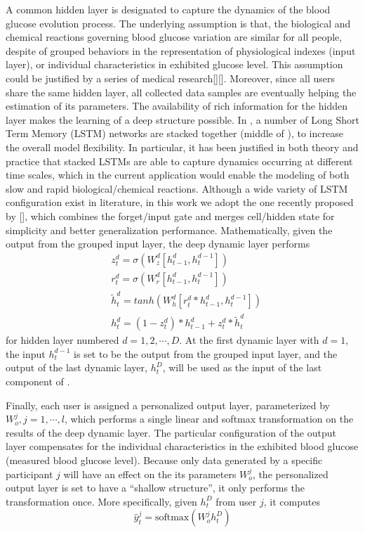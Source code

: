 A common hidden layer is designated to capture the dynamics of the blood glucose evolution process.
The underlying assumption is that, the biological and chemical reactions governing blood glucose variation are similar for all people, despite of grouped behaviors in the representation of physiological indexes (input layer), or individual characteristics in exhibited glucose level.
This assumption could be justified by a series of medical research[][].
Moreover, since all users share the same hidden layer, all collected data samples are eventually helping the estimation of its parameters.
The availability of rich information for the hidden layer makes the learning of a deep structure possible.
In \sysname, a number of Long Short Term Memory (LSTM) networks are stacked together (middle of ), to increase the overall model flexibility.
In particular, it has been justified in both theory and practice that stacked LSTMs are able to capture dynamics occurring at different time scales, which in the current application would enable the modeling of both slow and rapid biological/chemical reactions.
Although a wide variety of LSTM configuration exist in literature, in this work we adopt the one recently proposed by [], which combines the forget/input gate and merges cell/hidden state for simplicity and better generalization performance.
Mathematically, given the output from the grouped input layer, the deep dynamic layer performs
\begin{equation}
\begin{aligned}
&z^d_t = \sigma\left( W^d_z [h_{t-1}^d,h_t^{d-1}] \right) \\
&r^d_t = \sigma\left( W^d_r [h_{t-1}^d,h_t^{d-1}] \right) \\
&\tilde{h}_t^d = tanh\left( W^d_h [r_t^d*h_{t-1}^d,h_t^{d-1}] \right) \\
&h^d_t = (1-z_t^d)*h_{t-1}^d + z_t^d*\tilde{h}_t^d
\end{aligned}
\end{equation}
for hidden layer numbered $d = 1,2,\cdots,D$. At the first dynamic layer with $d=1$, the input $h_t^{d-1}$ is set to be the output from the grouped input layer, and the output of the last dynamic layer, $h^D_t$, will be used as the input of the last component of \modelname.

Finally, each user is assigned a personalized output layer, parameterized by $W_o^j, j=1,\cdots,l$, which performs a single linear and softmax transformation on the results of the deep dynamic layer.
The particular configuration of the output layer compensates for the individual characteristics in the exhibited blood glucose (\ie measured blood glucose level).
Because only data generated by a specific participant $j$ will have an effect on the its parameters $W_o^j$, the personalized output layer is set to have a ``shallow structure'', \ie it only performs the transformation once.
More specifically, given $h^D_t$ from user $j$, it computes
\begin{equation}
\hat{y}_t^j = \text{softmax} \left( W_o^j h^D_t \right)
\end{equation}

